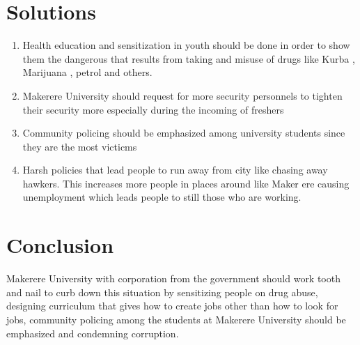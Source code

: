 \documentclass{article}
\begin{document}
\section{Solutions}
\begin{enumerate}
\item Health education and sensitization in youth should be done in order to show them the dangerous that results from taking and misuse of drugs like Kurba , Marijuana , petrol and others. 
\item	Makerere University should request for more security  personnels  to tighten their security more especially during the incoming of freshers
\item Community policing should be emphasized among university students since they are the most victicms
\item Harsh policies that lead people to run away from city like chasing away hawkers. This increases more people in places around like Maker ere causing unemployment which leads people to still those who are working.
\end{enumerate}
\section{Conclusion}
Makerere University with corporation from the government should work tooth and nail to curb down this situation by sensitizing people on drug abuse, designing curriculum that gives how to create jobs other than how to look for jobs, community policing among the students at Makerere University should be emphasized and condemning corruption.
\end{document}
